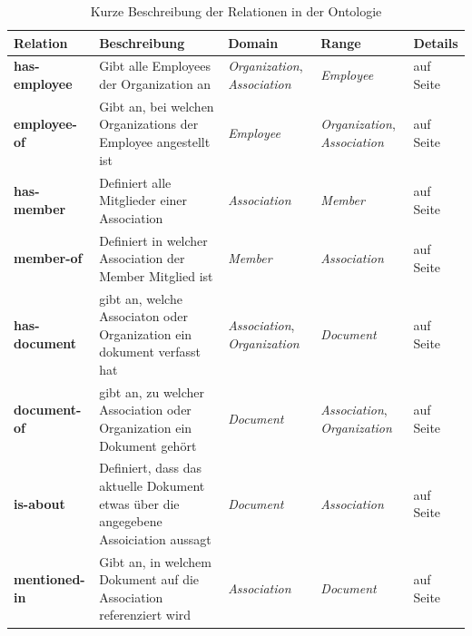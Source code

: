 \documentclass[
    11pt,
    latin1,
    a4paper,
    oneside
]{scrreprt}
\begin{document}
\begin{table}[H]
  \centering
  \begin{tabular}{ | l | p{4cm} | p{3cm} | p{2cm} | p{2cm} | }
    \hline
    \textbf{Relation} & \textbf{Beschreibung} & \textbf{Domain} & \textbf{Range} & \textbf{Details} \\ \hline
    \textbf{has-employee} & Gibt alle Employees der Organization an & \emph{Organization}, \emph{Association} & \emph{Employee} & \nameref{sec:rel_hasemployee} auf Seite \pageref{sec:rel_hasemployee} \\ \hline
    \textbf{employee-of} & Gibt an, bei welchen Organizations der Employee angestellt ist & \emph{Employee} & \emph{Organization}, \emph{Association} & \nameref{sec:rel_employeeof} auf Seite \pageref{sec:rel_employeeof} \\ \hline
    \textbf{has-member} & Definiert alle Mitglieder einer Association & \emph{Association} & \emph{Member} & \nameref{sec:rel_hasmember} auf Seite \pageref{sec:rel_hasmember} \\ \hline
    \textbf{member-of} & Definiert in welcher Association der Member Mitglied ist & \emph{Member} & \emph{Association} & \nameref{sec:rel_memberof} auf Seite \pageref{sec:rel_memberof} \\ \hline
    \textbf{has-document} & gibt an, welche Associaton oder Organization ein dokument verfasst hat & \emph{Association}, \emph{Organization} & \emph{Document} & \nameref{sec:rel_hasdocument} auf Seite \pageref{sec:rel_hasdocument} \\ \hline
    \textbf{document-of} & gibt an, zu welcher Association oder Organization ein Dokument geh\"ort & \emph{Document} & \emph{Association}, \emph{Organization} & \nameref{sec:rel_documentof} auf Seite \pageref{sec:rel_documentof} \\ \hline
    \textbf{is-about} & Definiert, dass das aktuelle Dokument etwas \"uber die angegebene Assoiciation aussagt & \emph{Document} & \emph{Association} & \nameref{sec:rel_isabout} auf Seite \pageref{sec:rel_isabout} \\ \hline
    \textbf{mentioned-in} & Gibt an, in welchem Dokument auf die Association referenziert wird & \emph{Association} & \emph{Document} & \nameref{sec:rel_mentionedin} auf Seite \pageref{sec:rel_mentionedin} \\ \hline
  \end{tabular}
  \caption{Kurze Beschreibung der Relationen in der Ontologie}
  \label{tbl:classes}
\end{table}
\end{document}
